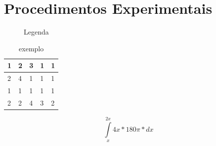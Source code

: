 \section{Procedimentos Experimentais}
\lipsum[1]
\begin{figure}[h]
	\caption{Legenda}
	\label{fig:placeholder.jpg}
\end{figure}
\begin{table}[h]
	\centering
	\label{my-label}
	\begin{tabular}{|l|l|l|l|l|}
		\hline 1 & 2 & 3 & 1 & 1 \\
		\hline 2 & 4 & 1 & 1 & 1 \\
		\hline 1 & 1 & 1 & 1 & 1 \\
		\hline 2 & 2 & 4 & 3 & 2 \\
		\hline
	\end{tabular}
	\caption{exemplo}
\end{table}
\begin{center}
	\begin{equation}
	\int\limits_{x}^{2x} 4x*180\pi*dx
	\end{equation}
\end{center}